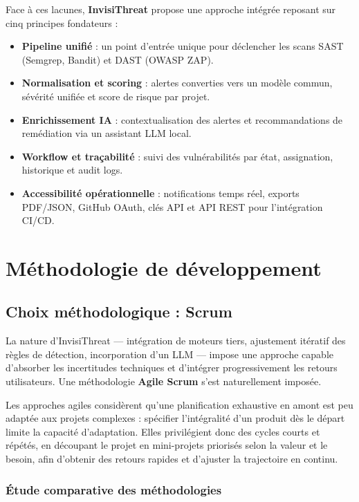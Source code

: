 Face à ces lacunes, \textbf{InvisiThreat} propose une approche intégrée reposant sur cinq principes fondateurs :

\begin{itemize}
  \item \textbf{Pipeline unifié} : un point d'entrée unique pour déclencher les scans SAST (Semgrep, Bandit) et DAST (OWASP ZAP).
  \item \textbf{Normalisation et scoring} : alertes converties vers un modèle commun, sévérité unifiée et score de risque par projet.
  \item \textbf{Enrichissement IA} : contextualisation des alertes et recommandations de remédiation via un assistant LLM local.
  \item \textbf{Workflow et traçabilité} : suivi des vulnérabilités par état, assignation, historique et audit logs.
  \item \textbf{Accessibilité opérationnelle} : notifications temps réel, exports PDF/JSON, GitHub OAuth, clés API et API REST pour l'intégration CI/CD.
\end{itemize}

\section{Méthodologie de développement}

\subsection{Choix méthodologique : Scrum}

La nature d'InvisiThreat — intégration de moteurs tiers, ajustement itératif des règles de détection, incorporation d'un LLM — impose une approche capable d'absorber les incertitudes techniques et d'intégrer progressivement les retours utilisateurs. Une méthodologie \textbf{Agile Scrum} s'est naturellement imposée.

Les approches agiles considèrent qu'une planification exhaustive en amont est peu adaptée aux projets complexes : spécifier l'intégralité d'un produit dès le départ limite la capacité d'adaptation. Elles privilégient donc des cycles courts et répétés, en découpant le projet en mini-projets priorisés selon la valeur et le besoin, afin d'obtenir des retours rapides et d'ajuster la trajectoire en continu.

\subsubsection{Étude comparative des méthodologies}

